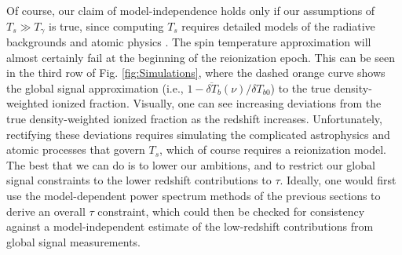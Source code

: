 \documentclass[twocolumn,aps,prd,nofootinbib,showpacs]{revtex4-1}
\begin{document}
Of course, our claim of model-independence holds only if our assumptions of $T_s \gg T_\gamma$ is true, since computing $T_s$ requires detailed models of the radiative backgrounds and atomic physics \cite{hirata2006,hirata_and_sigurdson2007}. The spin temperature approximation will almost certainly fail at the beginning of the reionization epoch. This can be seen in the third row of Fig. \ref{fig:Simulations}, where the dashed orange curve shows the global signal approximation (i.e., $1- \overline{\delta T}_b (\nu)/\delta T_{b0}$) to the true density-weighted ionized fraction. Visually, one can see increasing deviations from the true density-weighted ionized fraction as the redshift increases. Unfortunately, rectifying these deviations requires simulating the complicated astrophysics and atomic processes that govern $T_s$, which of course requires a reionization model. The best that we can do is to lower our ambitions, and to restrict our global signal constraints to the lower redshift contributions to $\tau$. Ideally, one would first use the model-dependent power spectrum methods of the previous sections to derive an overall $\tau$ constraint, which could then be checked for consistency against a model-independent estimate of the low-redshift contributions from global signal measurements.
\end{document}

